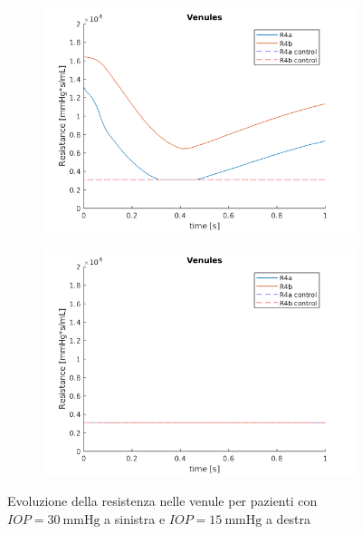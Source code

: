 \documentclass{article}
\begin{document}
\begin{figure}[ht]
\begin{subfigure}{.5\textwidth}
  \centering
  \includegraphics[width=1.0\linewidth]{Pictures/IOP30_part1/venules_30.png}
\end{subfigure}
\begin{subfigure}{.5\textwidth}
  \centering
  \includegraphics[width=1.0\linewidth]{Pictures/IOP15_part1/venules_15.png}
\end{subfigure}
\caption{Evoluzione della resistenza nelle venule per pazienti con $IOP = \SI{30}{\mmHg}$ a sinistra e $IOP = \SI{15}{\mmHg}$ a destra}
\label{venule1530}
\end{figure}
\end{document}
